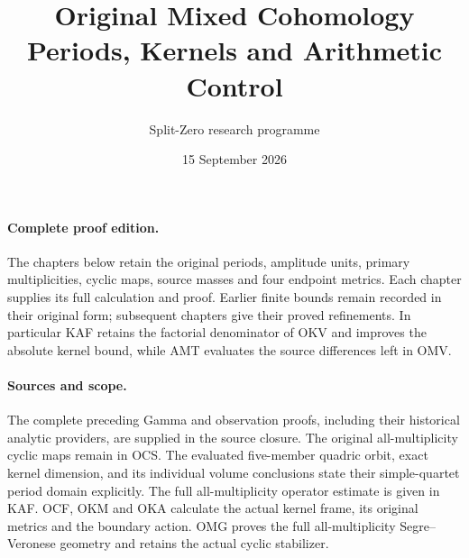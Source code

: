 \documentclass[11pt,a4paper]{article}
\title{Original Mixed Cohomology\\Periods, Kernels and Arithmetic Control}
\author{Split-Zero research programme}
\date{15 September 2026}
\begin{document}
\maketitle
\paragraph{Complete proof edition.}
The chapters below retain the original periods, amplitude units,
primary multiplicities, cyclic maps, source masses and four endpoint
metrics. Each chapter supplies its full calculation and proof. Earlier
finite bounds remain recorded in their original form; subsequent
chapters give their proved refinements. In particular KAF retains the
factorial denominator of OKV and improves the absolute kernel bound,
while AMT evaluates the source differences left in OMV.
\paragraph{Sources and scope.}
The complete preceding Gamma and observation proofs, including their
historical analytic providers, are supplied in the source closure.
The original all-multiplicity cyclic maps remain in OCS. The evaluated
five-member quadric orbit, exact kernel dimension, and its individual
volume conclusions state their simple-quartet period domain explicitly.
The full all-multiplicity operator estimate is given in KAF.
OCF, OKM and OKA calculate the actual kernel frame, its original
metrics and the boundary action. OMG proves the full all-multiplicity
Segre--Veronese geometry and retains the actual cyclic stabilizer.
\end{document}
